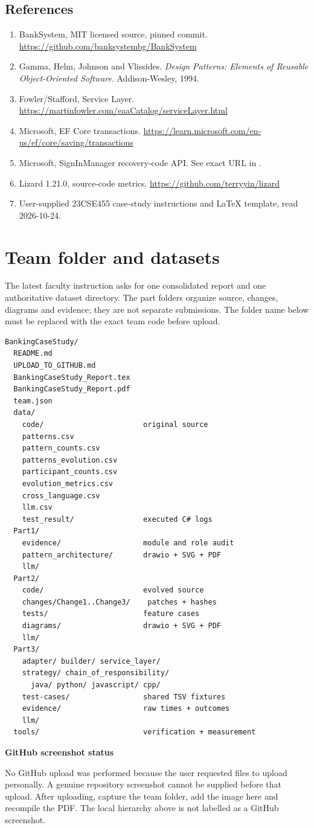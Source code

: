 \documentclass[11pt,a4paper]{article}
\newcommand{\code}[1]{\texttt{\detokenize{#1}}}
\begin{document}
\subsection{References}
\begin{enumerate}
\item BankSystem, MIT licensed source, pinned commit. \url{https://github.com/banksystembg/BankSystem}
\item Gamma, Helm, Johnson and Vlissides. \emph{Design Patterns: Elements of Reusable Object-Oriented Software}. Addison-Wesley, 1994.
\item Fowler/Stafford, Service Layer. \url{https://martinfowler.com/eaaCatalog/serviceLayer.html}
\item Microsoft, EF Core transactions. \url{https://learn.microsoft.com/en-us/ef/core/saving/transactions}
\item Microsoft, SignInManager recovery-code API. See exact URL in \code{REFERENCES.md}.
\item Lizard 1.21.0, source-code metrics. \url{https://github.com/terryyin/lizard}
\item User-supplied 23CSE455 case-study instructions and LaTeX template, read 2026-10-24.
\end{enumerate}
\clearpage
\section{Team folder and datasets}
The latest faculty instruction asks for one consolidated report and one authoritative dataset directory. The part folders organize source, changes, diagrams and evidence; they are not separate submissions. The folder name below must be replaced with the exact team code before upload.
\begin{lstlisting}
BankingCaseStudy/
  README.md
  UPLOAD_TO_GITHUB.md
  BankingCaseStudy_Report.tex
  BankingCaseStudy_Report.pdf
  team.json
  data/
    code/                       original source
    patterns.csv
    pattern_counts.csv
    patterns_evolution.csv
    participant_counts.csv
    evolution_metrics.csv
    cross_language.csv
    llm.csv
    test_result/                executed C# logs
  Part1/
    evidence/                   module and role audit
    pattern_architecture/       drawio + SVG + PDF
    llm/
  Part2/
    code/                       evolved source
    changes/Change1..Change3/    patches + hashes
    tests/                      feature cases
    diagrams/                   drawio + SVG + PDF
    llm/
  Part3/
    adapter/ builder/ service_layer/
    strategy/ chain_of_responsibility/
      java/ python/ javascript/ cpp/
    test-cases/                 shared TSV fixtures
    evidence/                   raw times + outcomes
    llm/
  tools/                        verification + measurement
\end{lstlisting}
\textbf{GitHub screenshot status}\par
No GitHub upload was performed because the user requested files to upload personally. A genuine repository screenshot cannot be supplied before that upload. After uploading, capture the team folder, add the image here and recompile the PDF. The local hierarchy above is not labelled as a GitHub screenshot.
\end{document}
